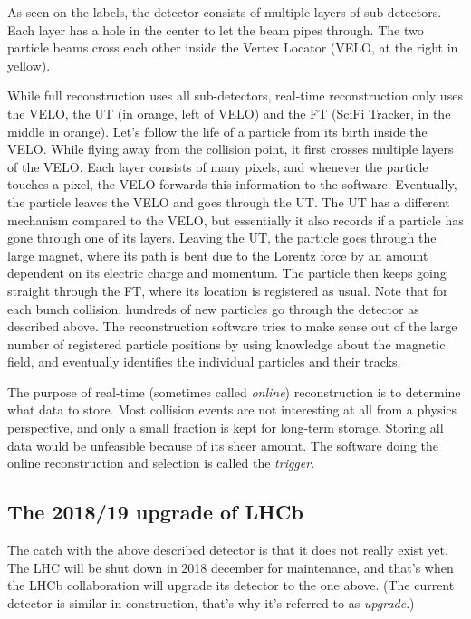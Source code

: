 \documentclass[12pt]{article}
\begin{document}
	As seen on the labels, the detector consists of multiple layers of sub-detectors. Each layer has a hole in the center to let the beam pipes through. The two particle beams cross each other inside the Vertex Locator (VELO, at the right in yellow).
	
	While full reconstruction uses all sub-detectors, real-time reconstruction only uses the VELO, the UT (in orange, left of VELO) and the FT (SciFi Tracker, in the middle in orange). Let's follow the life of a particle from its birth inside the VELO. While flying away from the collision point, it first crosses multiple layers of the VELO. Each layer consists of many pixels, and whenever the particle touches a pixel, the VELO forwards this information to the software. Eventually, the particle leaves the VELO and goes through the UT. The UT has a different mechanism compared to the VELO, but essentially it also records if a particle has gone through one of its layers. Leaving the UT, the particle goes through the large magnet, where its path is bent due to the Lorentz force by an amount dependent on its electric charge and momentum. The particle then keeps going straight through the FT, where its location is registered as usual. Note that for each bunch collision, hundreds of new particles go through the detector as described above. The reconstruction software tries to make sense out of the large number of registered particle positions by using knowledge about the magnetic field, and eventually identifies the individual particles and their tracks.
	
	The purpose of real-time (sometimes called \textit{online}) reconstruction is to determine what data to store. Most collision events are not interesting at all from a physics perspective, and only a small fraction is kept for long-term storage. Storing all data would be unfeasible because of its sheer amount. The software doing the online reconstruction and selection is called the \textit{trigger}.
	
	\subsection{The 2018/19 upgrade of LHCb}
	
	The catch with the above described detector is that it does not really exist yet. The LHC will be shut down in 2018 december for maintenance, and that's when the LHCb collaboration will upgrade its detector to the one above. (The current detector is similar in construction, that's why it's referred to as \textit{upgrade}.)
	
\end{document}
